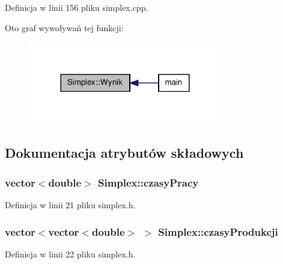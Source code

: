 \-Definicja w linii 156 pliku simplex.\-cpp.



\-Oto graf wywoływań tej funkcji\-:\nopagebreak
\begin{figure}[H]
\begin{center}
\leavevmode
\includegraphics[width=240pt]{class_simplex_a6989aacd7767392a9871157a8bd8c67d_icgraph}
\end{center}
\end{figure}




\subsection{\-Dokumentacja atrybutów składowych}
\hypertarget{class_simplex_a274a651cf1805d25483f1c190d41c0b3}{
\subsubsection[{czasy\-Pracy}]{\setlength{\rightskip}{0pt plus 5cm}vector$<$double$>$ {\bf \-Simplex\-::czasy\-Pracy}}}\label{class_simplex_a274a651cf1805d25483f1c190d41c0b3}


\-Definicja w linii 21 pliku simplex.\-h.

\hypertarget{class_simplex_a05c1f84eee26b312e4f918016c435a48}{
\subsubsection[{czasy\-Produkcji}]{\setlength{\rightskip}{0pt plus 5cm}vector$<$vector$<$double$>$ $>$ {\bf \-Simplex\-::czasy\-Produkcji}}}\label{class_simplex_a05c1f84eee26b312e4f918016c435a48}


\-Definicja w linii 22 pliku simplex.\-h.

